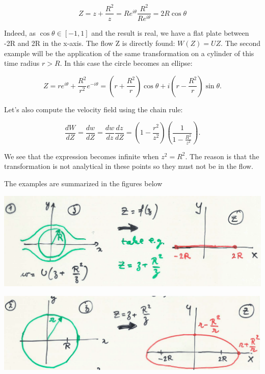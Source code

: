 \documentclass[british,french,11pt, a4paper, openany]{article}
\begin{document}
\begin{equation}
Z = z + \frac{R^2}{z} = Re^{i\theta}  \frac{R^2}{Re^{i\theta}} = 2 R \cos \theta 
\end{equation}

Indeed, as $\cos \theta \in [-1,1]$ and the result is real, we have a flat plate between -2R and 2R in the x-axis. The flow Z is directly found: $W(Z) = UZ$. The second example will be the application of the same transformation on a cylinder of this time radius $r>R$. In this case the circle becomes an ellipse:

\begin{equation}
Z = r e^{i\theta} + \frac{R^2}{r^2}e^{-i\theta} = \left( r + \frac{R^2}{r} \right)\cos \theta + i \left( r - \frac{R^2}{r} \right) \sin \theta.
\end{equation}		 

Let's also compute the velocity field using the chain rule:

\begin{equation}
\frac{dW}{dZ} = \frac{dw}{dZ} = \frac{dw}{dz}\frac{dz}{dZ} = \left( 1 -\frac{r^2}{z^2} \right) \left( \frac{1}{1-\frac{R^2}{z^2}} \right).
\end{equation}

We see that the expression becomes infinite when $z^2 = R^2$. The reason is that the transformation is not analytical in these points so they must not be in the flow. 

The examples are summarized in the figures below 

\begin{center}
	\begin{minipage}{0.45\textwidth}
		\includegraphics[scale=0.15]{ch2/29}
	\end{minipage}
	\begin{minipage}{0.45\textwidth}
		\includegraphics[scale=0.2]{ch2/30}
	\end{minipage}
\end{center}
\end{document}
